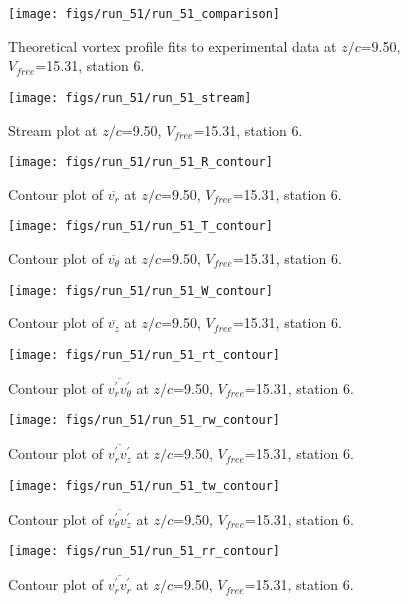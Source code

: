 \begin{figure}[H]
\centering
\texttt{[image: figs/run\_51/run\_51\_comparison]}
\caption{Theoretical vortex profile fits to experimental data at $z/c$=9.50, $V_{free}$=15.31, station 6.}
\end{figure}


\begin{figure}[H]
\centering
\texttt{[image: figs/run\_51/run\_51\_stream]}
\caption{Stream plot at $z/c$=9.50, $V_{free}$=15.31, station 6.}
\end{figure}


\begin{figure}[H]
\centering
\texttt{[image: figs/run\_51/run\_51\_R\_contour]}
\caption{Contour plot of $\overline{v_{r}}$ at $z/c$=9.50, $V_{free}$=15.31, station 6.}
\end{figure}


\begin{figure}[H]
\centering
\texttt{[image: figs/run\_51/run\_51\_T\_contour]}
\caption{Contour plot of $\overline{v_{\theta}}$ at $z/c$=9.50, $V_{free}$=15.31, station 6.}
\end{figure}


\begin{figure}[H]
\centering
\texttt{[image: figs/run\_51/run\_51\_W\_contour]}
\caption{Contour plot of $\overline{v_{z}}$ at $z/c$=9.50, $V_{free}$=15.31, station 6.}
\end{figure}


\begin{figure}[H]
\centering
\texttt{[image: figs/run\_51/run\_51\_rt\_contour]}
\caption{Contour plot of $\overline{v_{r}^{\prime} v_{\theta}^{\prime}}$ at $z/c$=9.50, $V_{free}$=15.31, station 6.}
\end{figure}


\begin{figure}[H]
\centering
\texttt{[image: figs/run\_51/run\_51\_rw\_contour]}
\caption{Contour plot of $\overline{v_{r}^{\prime} v_{z}^{\prime}}$ at $z/c$=9.50, $V_{free}$=15.31, station 6.}
\end{figure}


\begin{figure}[H]
\centering
\texttt{[image: figs/run\_51/run\_51\_tw\_contour]}
\caption{Contour plot of $\overline{v_{\theta}^{\prime} v_{z}^{\prime}}$ at $z/c$=9.50, $V_{free}$=15.31, station 6.}
\end{figure}


\begin{figure}[H]
\centering
\texttt{[image: figs/run\_51/run\_51\_rr\_contour]}
\caption{Contour plot of $\overline{v_{r}^{\prime} v_{r}^{\prime}}$ at $z/c$=9.50, $V_{free}$=15.31, station 6.}
\end{figure}


